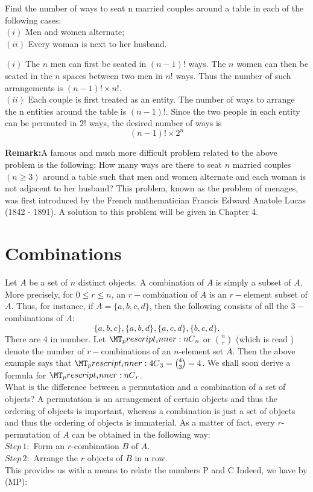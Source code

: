 \documentclass[a4paper,11pt]{book}
\newcommand\comb[2][^n]{\prescript{#1\mkern-0.5mu}{}C_{#2}}
\begin{document}
\begin{example}
Find the number of ways to seat n married couples 
around a table in each of the following cases:\\ 
$(i)$ Men and women alternate;\\ 
$(ii)$ Every woman is next to her husband. 
\end{example}
\begin{soln}
$(i)$ The $n$ men can first be seated in $(n - 1)!$ ways. The 
$n$ women can then be seated in the $n$ spaces between two men in $n!$ ways. Thus the number of such arrangements is $(n - 1)! \times n!$.\\
$(ii)$ Each couple is first treated as an entity. The number of ways to arrange the n entities around the table is $(n -1)!$. Since the two people in each entity can be permuted in $2!$ ways, the desired number of ways is 
\[(n - 1)! \times 2^n \] 

\end{soln}
\textbf{Remark:}A famous and much more difficult problem related to the above problem is the following: How many ways are there to seat $n$ married couples $(n \ge 3)$ around a table such that men and women alternate and each woman is not adjacent to her husband? This problem, known as the problem of menages, was first introduced by the French mathematician Francis Edward Anatole Lucas (1842 - 1891). A solution to this problem will be given in Chapter 4. 

\section{Combinations}
Let $A$ be a set of $n$ distinct objects. A combination of $A$ is simply a subset of $A$. More precisely, for $0 \le r \le n$, an $r-$combination of $A$ is an $r-$element 
subset of $A$. Thus, for instance, if $A = \{a, b, c, d\}$, then the following consists of all the $3-$combinations of $A$:
\[\{ a, b, c \}, \{a, b, d\}, \{a, c, d\}, \{ b, c, d\}. \] 
There are 4 in number. Let $\comb[n]{n}$ or $\binom{n}{r}$ (which is read ) denote the 
number of $r-$combinations of an $n$-element set $A$. Then the above example says that $\comb[4]{3}=\binom{4}{3}=4$. We shall soon derive a formula for $\comb[n]{r}$.\\

What is the difference between a permutation and a combination of a set of objects? A permutation is an arrangement of certain objects and thus the ordering of objects is important, whereas a combination is just a set of objects and thus the ordering of objects is immaterial. As a matter of fact, every $r$-permutation of $A$ can be obtained in the following way: \\

$Step\,1:$ Form an $r$-combination $B$ of $A$. \\

$Step\,2:$ Arrange the $r$ objects of $B$ in a row. \\

This provides us with a means to relate the numbers P and C Indeed, 
we have by (MP): 
\end{document}
